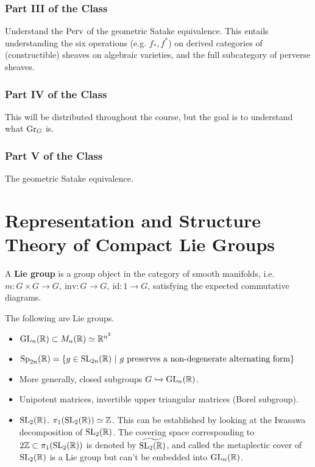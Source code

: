 \subsubsection{Part III of the Class} Understand the $\mathrm{Perv}$ of the geometric
Satake equivalence. This entails understanding the six operations (e.g. $f_*,
f^*$) on derived categories of (constructible) sheaves on algebraic varieties,
and the full subcategory of perverse sheaves.

\subsubsection{Part IV of the Class} This will be distributed throughout the
course, but the goal is to understand what $\mathrm{Gr}_{G}$ is.

\subsubsection{Part V of the Class} The geometric Satake equivalence.

\section{Representation and Structure Theory of Compact Lie Groups}

\begin{defn}
A \textbf{Lie group} is a group object in the category of smooth manifolds, i.e.
$m: G \times G \rightarrow G, \ \mathrm{inv}: G \rightarrow G,
\ \mathrm{id}: {1} \rightarrow G$, satisfying the expected commutative diagrams.
\end{defn}

\begin{exmpl}
The following are Lie groups.

\begin{itemize}
\item $\mathrm{GL}_{n}({\mathbb{R}}) \subset M_n(\mathbb{R}) \simeq \mathbb{R}^{n^2}$
\item $\mathrm{Sp}_{2n}({\mathbb{R}}) = \{ g \in \mathrm{SL}_{2n}({\mathbb{R}}) \ | \
  g \ \textrm{preserves a non-degenerate alternating form} \}$
\item More generally, closed subgroups $G \xhookrightarrow{} \mathrm{GL}_{n}({\mathbb{R}})$.
\item Unipotent matrices, invertible upper triangular matrices (Borel subgroup).
\item $\mathrm{SL}_{2}({\mathbb{R}})$. $\pi_1(\mathrm{SL}_{2}({\mathbb{R}})) \simeq \mathbb{Z}$. This can be
established by looking at the Iwasawa decomposition of $\mathrm{SL}_{2}({\mathbb{R}})$.
The covering space corresponding to $2 \mathbb{Z} \subset \pi_1(\mathrm{SL}_{2}({\mathbb{R}}))$ is
denoted by $\widetilde{\mathrm{SL}_{2}({\mathbb{R}})}$, and called the metaplectic cover of
$\mathrm{SL}_{2}({\mathbb{R}})$ is a Lie group but can't be embedded into $\mathrm{GL}_{n}({\mathbb{R}})$.
\end{itemize}
\end{exmpl}

